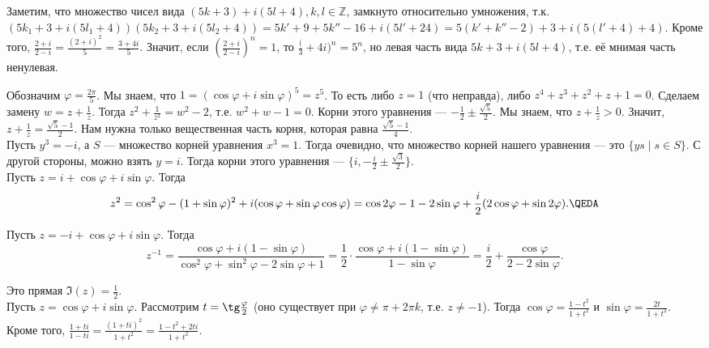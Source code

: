 \documentclass[12pt,a4paper]{article}
\begin{document}
\z Заметим, что множество чисел вида $(5k+3)+i(5l+4),k,l\in \mathbb Z$, замкнуто относительно умножения, т.к. $(5k_1+3+i(5l_1+4))(5k_2+3+i(5l_2+4))=5k'+9+5k''-16+i(5l'+24)=5(k'+k''-2)+3+i(5(l'+4)+4)$. Кроме того, $\frac{2+i}{2-i}=\frac{(2+i)^2}{5}=\frac{3+4i}{5}$. Значит, если $(\frac{2+i}{2-i})^n=1$, то $\frac(3+4i)^n=5^n$, но левая часть вида $5k+3+i(5l+4)$, т.е. её мнимая часть ненулевая.\QEDA\\

\newpage
{}\vskip20pt

\setcounter{probs}{0}
\z Обозначим $\varphi=\frac{2\pi}{5}$. Мы знаем, что $1=(\cos\varphi+i\sin\varphi)^5=z^5$. То есть либо $z=1$ (что неправда), либо $z^4+z^3+z^2+z+1=0$. Сделаем замену $w=z+\frac{1}{z}$. Тогда $z^2+\frac{1}{z^2}=w^2-2$, т.е. $w^2+w-1=0$. Корни этого уравнения --- $-\frac{1}{2}\pm\frac{\sqrt5}{2}$. Мы знаем, что $z+\frac{1}{z}>0$. Значит, $z+\frac{1}{z}=\frac{\sqrt5-1}{2}$. Нам нужна только вещественная часть корня, которая равна $\frac{\sqrt5-1}{4}$.\QEDA\\

\z Пусть $y^3=-i$, а $S$ --- множество корней уравнения $x^3=1$. Тогда очевидно, что множество корней нашего уравнения --- это $\{ys\mid s\in S\}$. С другой стороны, можно взять $y=i$. Тогда корни этого уравнения --- $\{i,-\frac{i}{2}\pm \frac{\sqrt 3}{2}\}$.\QEDA\\

\z Пусть $z=i+\cos\varphi+i\sin\varphi$. Тогда \[
	z^2=\cos^2\varphi-(1+\sin\varphi)^2+i(\cos\varphi+\sin\varphi\cos\varphi)=\cos2\varphi-1-2\sin\varphi+\frac{i}{2}(2\cos\varphi+\sin2\varphi).
\QEDA\]

\z Пусть $z=-i+\cos\varphi+i\sin\varphi$. Тогда \[
	z^{-1}=\frac{\cos\varphi+i(1-\sin\varphi)}{\cos^2\varphi+\sin^2\varphi-2\sin\varphi+1}=\frac{1}{2}\cdot\frac{\cos\varphi+i(1-\sin\varphi)}{1-\sin\varphi}=\frac{i}{2}+\frac{\cos\varphi}{2-2\sin\varphi}.
\]

Это прямая $\Im(z)=\frac{1}{2}$.\QEDA\\

\z Пусть $z=\cos\varphi+i\sin\varphi$. Рассмотрим $t=\tg\frac{\varphi}{2}$ (оно существует при $\varphi\neq \pi+2\pi k$, т.е. $z\neq -1$). Тогда $\cos\varphi=\frac{1-t^2}{1+t^2}$ и $\sin\varphi=\frac{2t}{1+t^2}$. Кроме того, $\frac{1+ti}{1-ti}=\frac{(1+ti)^2}{1+t^2}=\frac{1-t^2+2ti}{1+t^2}$.\QEDA\\

\newpage
{}\vskip20pt
\end{document}
